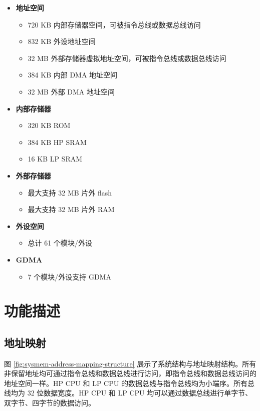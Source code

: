 \documentclass[main\_\_CN.tex]{subfiles}
\begin{document}
\begin{itemize}
    \item {\bfseries 地址空间}
        \begin{itemize}
    	    \item 720 KB 内部存储器空间，可被指令总线或数据总线访问
    	    \item 832 KB 外设地址空间
    	    \item 32 MB 外部存储器虚拟地址空间，可被指令总线或数据总线访问
    	    \item 384 KB 内部 DMA 地址空间
                \item 32 MB 外部 DMA 地址空间
        \end{itemize}
    \item {\bfseries 内部存储器}
        \begin{itemize}
            \item 320 KB ROM 
	        \item 384 KB HP SRAM
	        \item 16 KB LP SRAM
	    \end{itemize}
    \item {\bfseries 外部存储器}
        \begin{itemize}
            \item 最大支持 32 MB 片外 flash
            \item 最大支持 32 MB 片外 RAM
	    \end{itemize}
    \item \textbf{外设空间}
        \begin{itemize}
           \item 总计 61 个模块/外设
        \end{itemize}
    \item {\bfseries GDMA}
        \begin{itemize}
            \item 7 个模块/外设支持 GDMA
        \end{itemize}
\end{itemize}

\section{功能描述}

\subsection{地址映射}

图 \ref{fig:sysmem-address-mapping-structure} 展示了系统结构与地址映射结构。所有非保留地址均可通过指令总线和数据总线进行访问，即指令总线和数据总线访问的地址空间一样。HP CPU 和 LP CPU 的数据总线与指令总线均为小端序。所有总线均为 32 位数据宽度。HP CPU 和 LP CPU 均可以通过数据总线进行单字节、双字节、四字节的数据访问。
\end{document}
